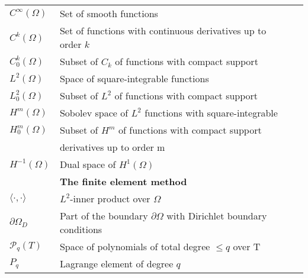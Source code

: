 \begin{tabular}{lll}
    $C^{\infty}(\Omega)$  & Set of smooth functions & \\[3pt]
    $C^k(\Omega)$  & Set of functions with continuous derivatives up to order $k$ & \\[3pt]
    $C^k_0(\Omega)$  & Subset of $C_k$ of functions with compact support &\\[3pt]
    $L^2(\Omega)$ & Space of square-integrable functions &\\[3pt]
    $L^2_0(\Omega)$  & Subset of $L^2$ of functions with compact support &\\[3pt]
    $H^m(\Omega)$ & Sobolev space of $L^2$ functions with square-integrable \\
    $H^m_0(\Omega)$  & Subset of $H^m$ of functions with compact support &\\[3pt]
    &  derivatives up to order m &\\[3pt]
    $H^{-1}(\Omega)$  & Dual space of $H^1(\Omega)$ &\\[3pt]
    & \textbf{The finite element method} & \\[3pt]
    $\langle \cdot, \cdot \rangle$  & $L^2$-inner product over $\Omega$ &\\[3pt]
    $\partial \Omega_D$  & Part of the boundary $\partial \Omega $
                                         with Dirichlet boundary conditions  &\\[3pt]
    $\mathcal{P}_q(T)$ &  Space of polynomials of total
                       degree $\leq q$ over T &\\[3pt]
    $P_q$   & Lagrange element of degree $q$ &\\[3pt]
\end{tabular}
\newpage

